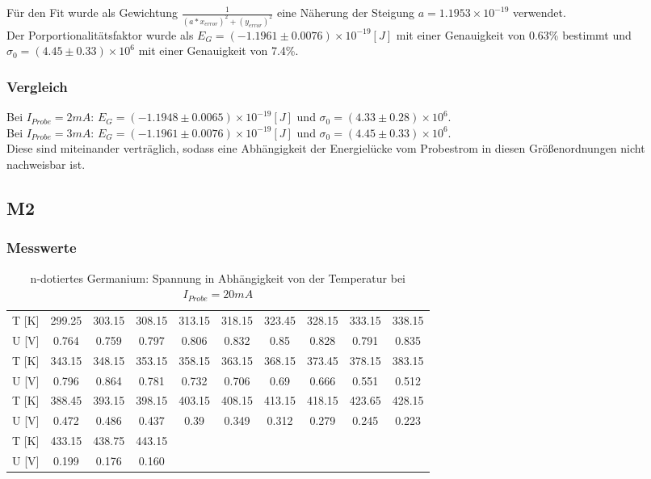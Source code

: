 Für den Fit wurde als Gewichtung $\frac{1}{(a*x_{error})^2+(y_{error})^2}$ eine Näherung der Steigung  $a=1.1953\times 10^{-19}$ verwendet.\\
Der Porportionalitätsfaktor wurde als $E_{G}=(-1.1961 \pm 0.0076)\times 10^{-19} [J]$ mit einer Genauigkeit von 0.63\% bestimmt und $\sigma_{0}=(4.45 \pm 0.33)\times 10^{6}$ mit einer Genauigkeit von 7.4\%.\\

\subsubsection{Vergleich}

Bei $I_{Probe}=2mA$: $E_{G}=(-1.1948 \pm 0.0065)\times 10^{-19} [J]$ und $\sigma_{0}=(4.33 \pm 0.28)\times 10^{6}$.\\
Bei $I_{Probe}=3mA$: $E_{G}=(-1.1961 \pm 0.0076)\times 10^{-19} [J]$ und $\sigma_{0}=(4.45 \pm 0.33)\times 10^{6}$.\\
Diese sind miteinander verträglich, sodass eine Abhängigkeit der Energielücke vom Probestrom in diesen Größenordnungen nicht nachweisbar ist.

\subsection{M2}

\subsubsection{Messwerte}
\begin{table}[H]
\centering
\begin{tabular}{|c||c|c|c|c|c|c|c|c|c|}
\hline
T [K] & 299.25 & 303.15 & 308.15 & 313.15 & 318.15 & 323.45 & 328.15 & 333.15 & 338.15 \\
 U [V] & 0.764 & 0.759 & 0.797 & 0.806 & 0.832 & 0.85 & 0.828 & 0.791 & 0.835 \\
 \hline
 T [K] & 343.15 & 348.15 & 353.15 & 358.15 & 363.15 & 368.15 & 373.45 & 378.15 & 383.15 \\
 U [V] & 0.796 & 0.864 & 0.781 & 0.732 & 0.706 & 0.69 & 0.666 & 0.551 & 0.512 \\
 \hline
 T [K] & 388.45 & 393.15 & 398.15 & 403.15 & 408.15 & 413.15 & 418.15 & 423.65 & 428.15 \\
 U [V] & 0.472 & 0.486 & 0.437 & 0.39 & 0.349 & 0.312 & 0.279 & 0.245 & 0.223 \\
 \hline
 T [K]& 433.15 & 438.75 & 443.15 & & & & & & \\
U [V] & 0.199 & 0.176 & 0.160 & & & & & & \\
 \hline
\end{tabular}
\caption{n-dotiertes Germanium: Spannung in Abhängigkeit von der Temperatur bei $I_{Probe}=20mA$}
\end{table}  

